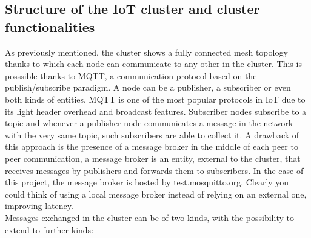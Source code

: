 \subsection{Structure of the IoT cluster and cluster functionalities}

As previously mentioned,
 the cluster shows a fully connected mesh topology thanks to which each node can communicate to any other in the cluster. This is posssible thanks to MQTT, a communication protocol based on the publish/subscribe paradigm. A node can be a publisher, a subscriber or even both kinds of entities. MQTT is one of the most popular protocols in IoT due to its light header overhead and broadcast features. Subscriber nodes subscribe to a topic and whenever a publisher node communicates a message in the network with the very same topic, such subscribers are able to collect it. A drawback of this approach is the presence of a message broker in the middle of each peer to peer communication, a message broker is an entity, external to the cluster, that receives messages by publishers and forwards them to subscribers. In the case of this project, the message broker is hosted by test.mosquitto.org. Clearly you could think of using a local message broker instead of relying on an external one, improving latency.\\
Messages exchanged in the cluster can be of two kinds, with the possibility to extend to further kinds:

